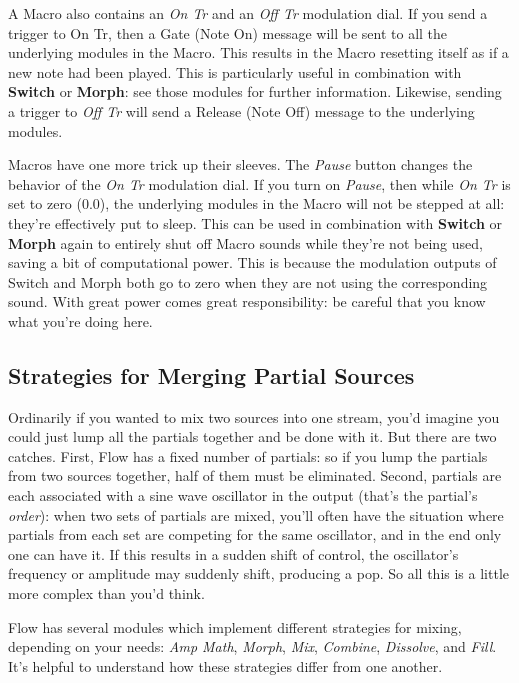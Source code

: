 \documentclass{article}
\newcommand\name{Flow}
\begin{document}
A Macro also contains an {\it On Tr} and an {\it Off Tr} modulation dial.  If you send a trigger to On Tr, then a Gate (Note On) message will be sent to all the underlying modules in the Macro.  This results in the Macro resetting itself as if a new note had been played.  This is particularly useful in combination with {\bf Switch} or {\bf Morph}: see those modules for further information.  Likewise, sending a trigger to {\it Off Tr} will send a Release (Note Off) message to the underlying modules.

Macros have one more trick up their sleeves.  The {\it Pause} button changes the behavior of the {\it On Tr} modulation dial.  If you turn on {\it Pause}, then while {\it On Tr} is set to zero (0.0), the underlying modules in the Macro will not be stepped at all: they're effectively put to sleep.  This can be used in combination with {\bf Switch} or {\bf Morph} again to entirely shut off Macro sounds while they're not being used, saving a bit of computational power.  This is because the modulation outputs of Switch and Morph both go to zero when they are not using the corresponding sound.  With great power comes great responsibility: be careful that you know what you're doing here.

\subsection{Strategies for Merging Partial Sources}
\label{mixingstrategies}

Ordinarily if you wanted to mix two sources into one stream, you'd imagine you could just lump all the partials together and be done with it.  But there are two catches.  First, {\name} has a fixed number of partials: so if you lump the partials from two sources together, half of them must be eliminated.  Second, partials are each associated with a sine wave oscillator in the output (that's the partial's {\it order}): when two sets of partials are mixed, you'll often have the situation where partials from each set are competing for the same oscillator, and in the end only one can have it.   If this results in a sudden shift of control, the oscillator's frequency or amplitude may suddenly shift, producing a pop. So all this is a little more complex than you'd think.

{\name} has several modules which implement different strategies for mixing, depending on your needs: {\it Amp Math}, {\it Morph}, {\it Mix}, {\it Combine}, {\it Dissolve}, and {\it Fill}. It's helpful to understand how these strategies differ from one another.
\end{document}
